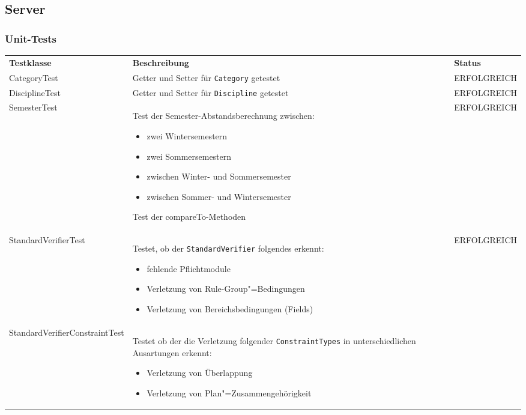 \FloatBarrier
\subsection{Server}

\subsubsection*{Unit-Tests}

\begin{longtable}{| >{\hspace{0pt}} p{} | >{\hspace{0pt}} p{} | >{\hspace{0pt}} p{} |}
	\hline
	\textbf{Testklasse} & \textbf{Beschreibung} & \textbf{Status} \\ 
	\hhline{|=|=|=|}  
	\endfirsthead
	\endhead
	CategoryTest & Getter und Setter für \texttt{Category} getestet & ERFOLGREICH \\
	\hline
	DisciplineTest & Getter und Setter für \texttt{Discipline} getestet & ERFOLGREICH \\
	\hline
	SemesterTest & Test der Semester-Abstandsberechnung zwischen:
	\begin{itemize}
		\item zwei Wintersemestern
		\item zwei Sommersemestern
		\item zwischen Winter- und Sommersemester
		\item zwischen Sommer- und Wintersemester
	\end{itemize}
	Test der compareTo-Methoden & ERFOLGREICH \\
	\hline
	StandardVerifierTest & Testet, ob der \texttt{StandardVerifier} folgendes erkennt:
	\begin{itemize}
		\item fehlende Pflichtmodule
		\item Verletzung von Rule-Group"=Bedingungen
		\item Verletzung von Bereichsbedingungen (Fields)
	\end{itemize} & ERFOLGREICH \\
	\hline
	StandardVerifierConstraintTest & Testet ob der die Verletzung folgender \texttt{ConstraintTypes} in unterschiedlichen Ausartungen erkennt:
	\begin{itemize}
		\item Verletzung von Überlappung 
		\item Verletzung von Plan"=Zusammengehörigkeit 

\end{itemize}
\end{longtable}
